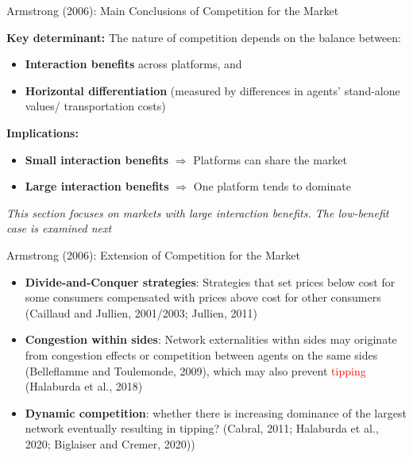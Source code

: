 \documentclass[aspectratio=169]{beamer}  %
\begin{document}
\begin{frame}{Armstrong (2006): Main Conclusions of Competition for the Market}
    \justifying  %
    
    \textbf{Key determinant:}  
    The nature of competition depends on the balance between:
    \begin{itemize}
        \item \textbf{Interaction benefits} across platforms, and
        \item \textbf{Horizontal differentiation} (measured by differences in agents’ stand-alone values/ transportation costs)
    \end{itemize}
    
    \vspace{0.5em}
    
    \textbf{Implications:}
    \begin{itemize}
        \item \textbf{Small interaction benefits} $\Rightarrow$ Platforms can share the market
        \item \textbf{Large interaction benefits} $\Rightarrow$ One platform tends to dominate
    \end{itemize}
    
    \vspace{0.5em}
    \textit{This section focuses on markets with large interaction benefits. The low-benefit case is examined next}
    
\end{frame}

\begin{frame}{Armstrong (2006): Extension of Competition for the Market}
    \justifying  %
    
    \begin{itemize}
        \item \textbf{Divide-and-Conquer strategies}: Strategies that set prices below cost for some consumers compensated with prices above cost for other consumers (Caillaud and Jullien, 2001/2003; Jullien, 2011)
        \vspace{1em}
        \item \textbf{Congestion within sides}: Network externalities withn sides may originate from congestion effects or competition between agents on the same sides (Belleflamme and Toulemonde, 2009), which may also prevent \textcolor{red}{tipping} (Halaburda et al., 2018)
        \vspace{1em}
        \item \textbf{Dynamic competition}: whether there is increasing dominance of the largest network eventually resulting in tipping? (Cabral, 2011; Halaburda et al., 2020; Biglaiser and Cremer, 2020))
    \end{itemize}
    
\end{frame}
\end{document}
